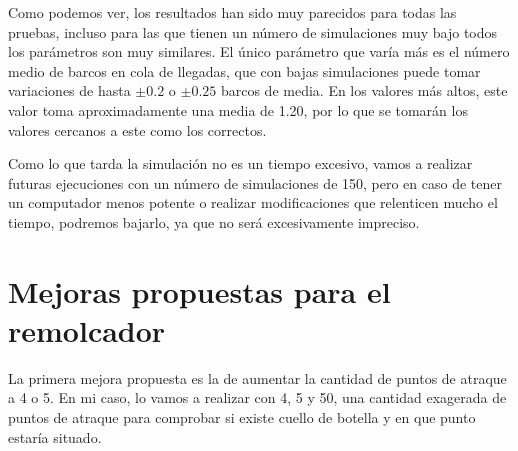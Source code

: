 \documentclass[11pt,a4paper]{report}
\begin{document}
Como podemos ver, los resultados han sido muy parecidos para todas las pruebas, incluso para las que tienen un número de simulaciones muy bajo todos los parámetros
son muy similares. El único parámetro que varía más es el número medio de barcos en cola de llegadas, que con bajas simulaciones puede tomar variaciones de hasta
$\pm0.2$ o $\pm0.25$ barcos de media. En los valores más altos, este valor toma aproximadamente una media de 1.20, por lo que se tomarán los valores cercanos a
este como los correctos.

Como lo que tarda la simulación no es un tiempo excesivo, vamos a realizar futuras ejecuciones con un número de simulaciones de 150, pero en caso de tener un
computador menos potente o realizar modificaciones que relenticen mucho el tiempo, podremos bajarlo, ya que no será excesivamente impreciso.


\section{Mejoras propuestas para el remolcador}

La primera mejora propuesta es la de aumentar la cantidad de puntos de atraque a 4 o 5. En mi caso, lo vamos a realizar con 4, 5 y 50, una cantidad exagerada de
puntos de atraque para comprobar si existe cuello de botella y en que punto estaría situado.
\end{document}
